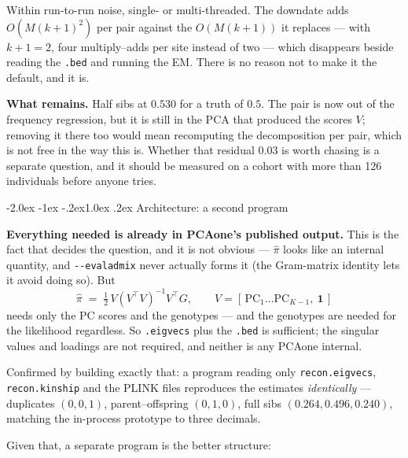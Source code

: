 \documentclass[10pt,a4paper]{article}
\makeatletter
\renewcommand\subsection{\@startsection{subsection}{2}{\z@}%
  {-2.0ex \@plus -1ex \@minus -.2ex}{1.0ex \@plus.2ex}%
  {\normalfont\normalsize\bfseries\color{hdr}}}
\makeatother
\begin{document}
\noindent
Within run-to-run noise, single- or multi-threaded. The downdate adds $O(M(k{+}1)^2)$ per pair against the
$O(M(k{+}1))$ it replaces --- with $k+1=2$, four multiply--adds per site instead of two --- which disappears
beside reading the \texttt{.bed} and running the EM. There is no reason not to make it the default, and it
is.

\medskip\noindent
\textbf{What remains.} Half sibs at $0.530$ for a truth of $0.5$. The pair is now out of the frequency
regression, but it is still in the PCA that produced the scores $V$; removing it there too would mean
recomputing the decomposition per pair, which is not free in the way this is. Whether that residual
$0.03$ is worth chasing is a separate question, and it should be measured on a cohort with more than
126 individuals before anyone tries.

\subsection{Architecture: a second program}

\textbf{Everything needed is already in PCAone's published output.} This is the fact that decides the
question, and it is not obvious --- $\hat\pi$ looks like an internal quantity, and
\texttt{-{}-evaladmix} never actually forms it (the Gram-matrix identity lets it avoid doing so). But
\begin{equation*}
\hat\pi \;=\; \tfrac12\,V(V^{\!\top}V)^{-1}V^{\!\top}G,\qquad V=[\,\mathrm{PC}_1\ldots\mathrm{PC}_{K-1},\ \mathbf 1\,]
\end{equation*}
needs only the PC scores and the genotypes --- and the genotypes are needed for the likelihood regardless.
So \texttt{.eigvecs} plus the \texttt{.bed} is sufficient; the singular values and loadings are not required,
and neither is any PCAone internal.

Confirmed by building exactly that: a program reading only \texttt{recon.eigvecs}, \texttt{recon.kinship} and
the PLINK files reproduces the estimates \emph{identically} --- duplicates $(0,0,1)$, parent--offspring
$(0,1,0)$, full sibs $(0.264,0.496,0.240)$, matching the in-process prototype to three decimals.

\medskip\noindent
Given that, a separate program is the better structure:
\end{document}
